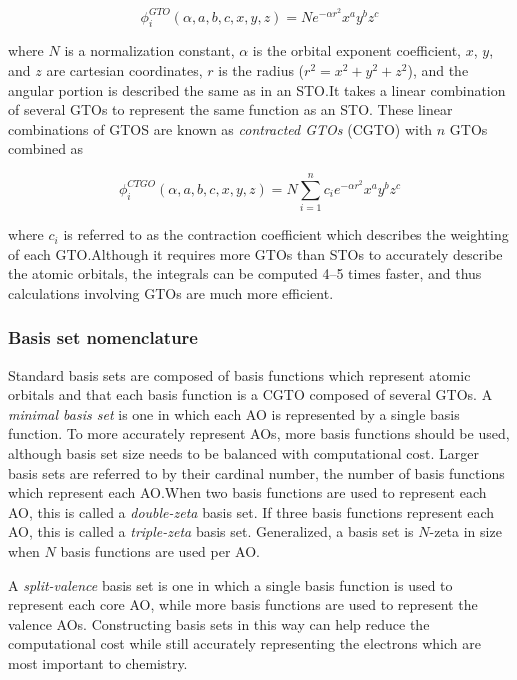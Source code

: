 \begin{equation}
\phi_i^{GTO}(\alpha,a,b,c,x,y,z) = N e^{-\alpha r^2} x^a y^b z^c
\end{equation}

\noindent where $N$ is a normalization constant, $\alpha$ is the orbital
exponent coefficient, $x$, $y$, and $z$ are cartesian coordinates, $r$ is the
radius ($r^2=x^2+y^2+z^2$), and the angular portion is described the same as in
an STO.\@ It takes a linear combination of several GTOs to represent the same
function as an STO. These linear combinations of GTOS are known as
\emph{contracted GTOs} (CGTO) with $n$ GTOs combined as

\begin{equation}
\phi_i^{CTGO}(\alpha,a,b,c,x,y,z) = N \sum_{i=1}^n c_i e^{-\alpha r^2} x^a y^b z^c
\end{equation}

\noindent where $c_i$ is referred to as the contraction coefficient which
describes the weighting of each GTO.\@ Although it requires more GTOs than STOs
to accurately describe the atomic orbitals, the integrals can be computed 4--5
times faster, and thus calculations involving GTOs are much more
efficient.\cite{Gill1994}

\subsubsection{Basis set nomenclature}

Standard basis sets are composed of basis functions which represent atomic
orbitals and that each basis function is a CGTO composed of several GTOs. A
\emph{minimal basis set} is one in which each AO is represented by a single
basis function. To more accurately represent AOs, more basis functions should
be used, although basis set size needs to be balanced with computational cost.
Larger basis sets are referred to by their cardinal number, the number of basis
functions which represent each AO.\@ When two basis functions are used to
represent each AO, this is called a \emph{double-zeta} basis set. If three
basis functions represent each AO, this is called a \emph{triple-zeta} basis
set. Generalized, a basis set is $N$-zeta in size when $N$ basis functions are
used per AO.\@

A \emph{split-valence} basis set is one in which a single basis function is
used to represent each core AO, while more basis functions are used to
represent the valence AOs. Constructing basis sets in this way can help reduce
the computational cost while still accurately representing the electrons which
are most important to chemistry.

